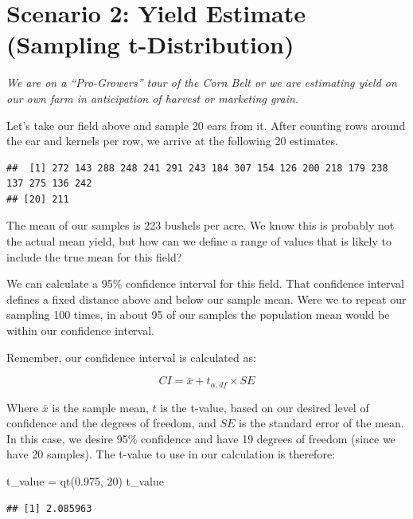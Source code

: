 \documentclass[
]{book}
\newenvironment{Shaded}{\begin{snugshade}}{\end{snugshade}}
\newcommand{\DecValTok}[1]{\textcolor[rgb]{0.00,0.00,0.81}{#1}}
\newcommand{\FloatTok}[1]{\textcolor[rgb]{0.00,0.00,0.81}{#1}}
\newcommand{\FunctionTok}[1]{\textcolor[rgb]{0.00,0.00,0.00}{#1}}
\newcommand{\NormalTok}[1]{#1}
\newcommand{\OtherTok}[1]{\textcolor[rgb]{0.56,0.35,0.01}{#1}}
\begin{document}
\hypertarget{scenario-2-yield-estimate-sampling-t-distribution}{%
\section{Scenario 2: Yield Estimate (Sampling t-Distribution)}\label{scenario-2-yield-estimate-sampling-t-distribution}}

\emph{We are on a ``Pro-Growers'' tour of the Corn Belt or we are estimating yield on our own farm in anticipation of harvest or marketing grain.}

Let's take our field above and sample 20 ears from it. After counting rows around the ear and kernels per row, we arrive at the following 20 estimates.

\begin{verbatim}
##  [1] 272 143 288 248 241 291 243 184 307 154 126 200 218 179 238 137 275 136 242
## [20] 211
\end{verbatim}

The mean of our samples is 223 bushels per acre. We know this is probably not the actual mean yield, but how can we define a range of values that is likely to include the true mean for this field?

We can calculate a 95\% confidence interval for this field. That confidence interval defines a fixed distance above and below our sample mean. Were we to repeat our sampling 100 times, in about 95 of our samples the population mean would be within our confidence interval.

Remember, our confidence interval is calculated as:

\[ CI = \bar{x} + t_{\alpha, df}\times SE\]

Where \(\bar{x}\) is the sample mean, \(t\) is the t-value, based on our desired level of confidence and the degrees of freedom, and \(SE\) is the standard error of the mean. In this case, we desire 95\% confidence and have 19 degrees of freedom (since we have 20 samples). The t-value to use in our calculation is therefore:

\begin{Shaded}
\begin{Highlighting}[]
\NormalTok{t\_value }\OtherTok{=} \FunctionTok{qt}\NormalTok{(}\FloatTok{0.975}\NormalTok{, }\DecValTok{20}\NormalTok{)}
\NormalTok{t\_value}
\end{Highlighting}
\end{Shaded}

\begin{verbatim}
## [1] 2.085963
\end{verbatim}
\end{document}
